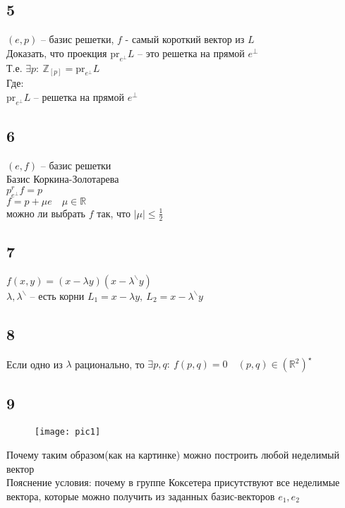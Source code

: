 	\subsection*{5}
	$(e,p)$ -- базис решетки, $f$ - самый короткий вектор из $L$\\
	Доказать, что проекция $\text{pr}_{e^{\perp}} L$ -- это решетка на прямой $e^{\bot}$\\
	Т.е. $\exists p: \ \mathbb{Z}_[p] = \text{pr}_{e^{\perp}} L$\\
	Где: \\
	$\text{pr}_{e^{\perp}} L$ --  решетка на прямой $e^{\perp}$
	
	\subsection*{6}
	$(e,f)$ -- базис решетки\\
	Базис Коркина-Золотарева\\
	$p^r_{e^{\bot}} f = p$\\
	$f = p + \mu e \quad \mu \in \mathbb{R}$\\
	можно ли выбрать $f$ так, что $|\mu| \leq \frac{1}{2}$
	
	\subsection*{7}
	$f(x,y) = (x - \lambda y)(x - \lambda^{\backslash} y)$\\
	$\lambda, \lambda^{\backslash}$ -- есть корни
	$L_1 = x - \lambda y, \ L_2 = x - \lambda^{\backslash} y$
		
	\subsection*{8}
	Если одно из $\lambda$ рационально, то $\exists p,q: \ f(p,q) = 0 \quad (p,q) \in (\mathbb{R}^2)^{\star}$
	
	\subsection*{9}
	\begin{figure}[h]
		\texttt{[image: pic1]}
	\end{figure}
	Почему таким образом(как на картинке) можно построить любой неделимый вектор\\
	Пояснение условия: почему в группе Коксетера присутствуют все неделимые вектора, которые можно получить из заданных базис-векторов $e_1, e_2$
	
